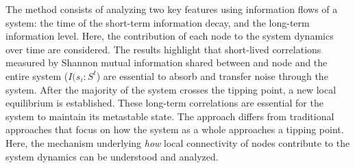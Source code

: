 \documentclass[a4paper, 11pt, twocolumn]{article}
\begin{document}
The method consists of analyzing two key features using information flows of a system: the time of the short-term information decay, and the long-term information level. Here, the contribution of each node to the system dynamics over time are considered. The results highlight that short-lived correlations measured by Shannon mutual information shared between and node and the entire system ($I(s_i : S^t$) are essential to absorb and transfer noise through the system. After the majority of the system crosses the tipping point, a new local equilibrium is established. These long-term correlations are essential for the system to maintain its metastable state.
The approach differs from traditional approaches that focus on how the system as a whole approaches a tipping point. Here, the mechanism underlying \emph{how} local connectivity of nodes contribute to the system dynamics can be understood and analyzed.
\end{document}
